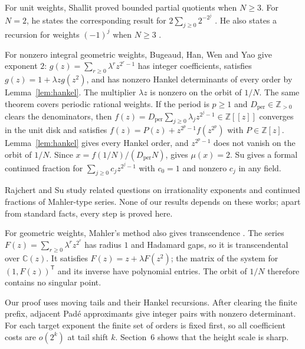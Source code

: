 \documentclass{amsart}
\numberwithin{equation}{section}
\newcommand{\Z}{\mathbb Z}
\begin{document}
For unit weights, Shallit \cite[Theorems~8--9]{Sh} proved bounded
partial quotients when $N\ge3$. For $N=2$, he states the corresponding
result for $2\sum_{j\ge0}2^{-2^j}$
\cite[Theorem~11 and following example]{Sh}.
He also states a recursion for weights $(-1)^j$ when $N\ge3$
\cite[Theorem~12]{Sh}.

For nonzero integral geometric weights, Bugeaud, Han, Wen and Yao
\cite[Theorem~2.1]{BHWY} give exponent $2$:
$g(z)=\sum_{r\ge0}\lambda^rz^{2^r-1}$ has integer coefficients,
satisfies $g(z)=1+\lambda zg(z^2)$, and has nonzero Hankel
determinants of every order by Lemma~\ref{lem:hankel}.
The multiplier $\lambda z$ is nonzero on the orbit of $1/N$.
The same theorem covers periodic rational weights. If the period is
$p\ge1$ and $D_{\mathrm{per}}\in\Z_{>0}$ clears the denominators, then
$f(z)=D_{\mathrm{per}}\sum_{j\ge0}\lambda_jz^{2^j-1}\in\Z[[z]]$
converges in the unit disk and satisfies
$f(z)=P(z)+z^{2^p-1}f(z^{2^p})$ with $P\in\Z[z]$.
Lemma~\ref{lem:hankel} gives every Hankel order, and $z^{2^p-1}$
does not vanish on the orbit of $1/N$. Since
$x=f(1/N)/(D_{\mathrm{per}}N)$, \cite[Theorem~2.1]{BHWY} gives
$\mu(x)=2$.
Su \cite[Theorem~7.3]{Su} gives a formal continued fraction for
$\sum_{j\ge0}c_jz^{2^j-1}$ with $c_0=1$ and nonzero $c_j$ in any
field.

Rajchert \cite{Ra} and Su \cite{Su} study related questions on irrationality exponents and continued fractions of Mahler-type series. None of our results depends on these works; apart from standard facts, every step is proved here.

For geometric weights, Mahler's method also gives transcendence
\cite[Corollary~2]{Ni90}. The series
$F(z)=\sum_{r\ge0}\lambda^rz^{2^r}$ has radius $1$ and Hadamard
gaps, so it is transcendental over $\mathbb C(z)$.
It satisfies $F(z)=z+\lambda F(z^2)$; the matrix of the system for
$(1,F(z))^{\mathsf T}$ and its inverse have polynomial entries.
The orbit of $1/N$ therefore contains no singular point.

Our proof uses moving tails and their Hankel recursions. After clearing
the finite prefix, adjacent Pad\'e approximants give integer pairs
with nonzero determinant. For each target exponent the finite set of
orders is fixed first, so all coefficient costs are $o(2^k)$ at tail
shift $k$. Section~6 shows that the height scale is sharp.
\end{document}
